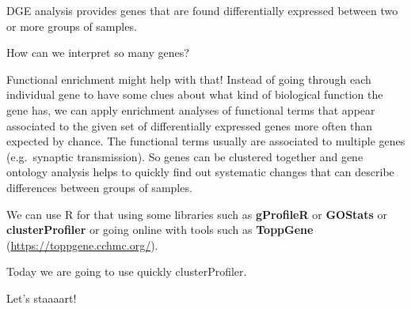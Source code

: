 \documentclass[]{book}
\begin{document}
DGE analysis provides genes that are found differentially expressed between two or more groups of samples.

How can we interpret so many genes?

Functional enrichment might help with that!
Instead of going through each individual gene to have some clues about what kind of biological function the gene has, we can apply
enrichment analyses of functional terms that appear associated to the given set of differentially expressed genes more often than expected by chance. The functional terms usually are associated to multiple genes (e.g.~synaptic transmission).
So genes can be clustered together and gene ontology analysis helps to quickly find out systematic changes that can describe differences between groups of samples.

We can use R for that using some libraries such as \textbf{gProfileR} or \textbf{GOStats} or \textbf{clusterProfiler} or going online with tools such as \textbf{ToppGene} (\url{https://toppgene.cchmc.org/}).

Today we are going to use quickly clusterProfiler.

Let's staaaart!
\end{document}
